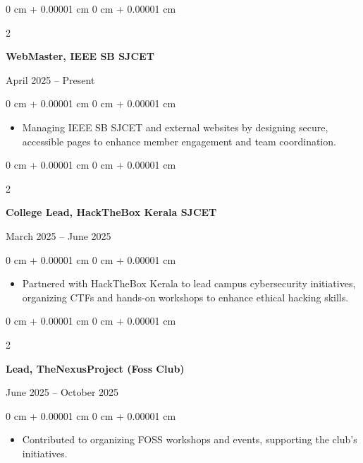 \documentclass[10pt, a4paper]{article}
\newenvironment{highlights}{
    \begin{itemize}[
        topsep=0.10 cm,
        parsep=0.10 cm,
        partopsep=0pt,
        itemsep=0pt,
        leftmargin=0 cm + 10pt
    ]
}{
    \end{itemize}
} %
\newenvironment{onecolentry}{
    \begin{adjustwidth}{
        0 cm + 0.00001 cm
    }{
        0 cm + 0.00001 cm
    }
}{
    \end{adjustwidth}
} %
\newenvironment{twocolentry}[2][]{
    \onecolentry
    \def\secondColumn{#2}
    \setcolumnwidth{\fill, 4.5 cm}
    \begin{paracol}{2}
}{
    \switchcolumn \raggedleft \secondColumn
    \end{paracol}
    \endonecolentry
} %
\begin{document}
\vspace{0.2 cm}

\begin{twocolentry}{
    April 2025 – Present
}
    \textbf{WebMaster, IEEE SB SJCET}
\end{twocolentry}

\vspace{0.10 cm}
\begin{onecolentry}
    \begin{highlights}
        \item Managing IEEE SB SJCET and external websites by designing secure, accessible pages to enhance member engagement and team coordination.
    \end{highlights}
\end{onecolentry}

    \vspace{0.2 cm}

\begin{twocolentry}{
    March 2025 – June 2025
}
    \textbf{College Lead, HackTheBox Kerala SJCET}
\end{twocolentry}

\vspace{0.10 cm}
\begin{onecolentry}
    \begin{highlights}
        \item Partnered with HackTheBox Kerala to lead campus cybersecurity initiatives, organizing CTFs and hands-on workshops to enhance ethical hacking skills.
    \end{highlights}
\end{onecolentry}

\vspace{0.2 cm}

\begin{twocolentry}{
    June 2025 – October 2025
}
    \textbf{Lead, TheNexusProject (Foss Club)}
\end{twocolentry}

\vspace{0.10 cm}
\begin{onecolentry}
    \begin{highlights}
        \item Contributed to organizing FOSS workshops and events, supporting the club's initiatives.
    \end{highlights}
\end{onecolentry}

        \vspace{0.2 cm}
\end{document}
